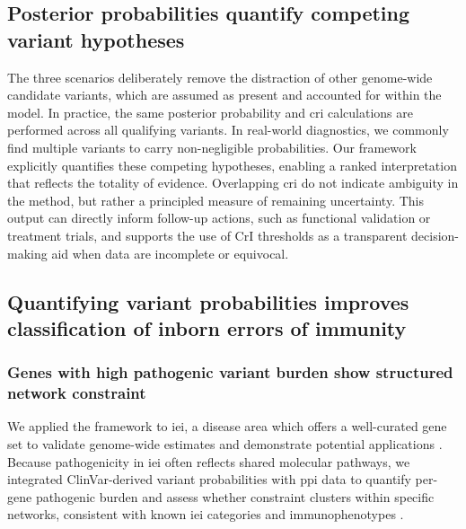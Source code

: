 \subsection{Posterior probabilities quantify competing variant hypotheses}

The three scenarios deliberately remove the distraction of other genome-wide candidate variants, which are assumed as present and accounted for within the model. In practice, the same posterior probability and \ac{cri} calculations are performed across all qualifying variants. 
In real-world diagnostics, we commonly find multiple variants to carry non-negligible probabilities. 
Our framework explicitly quantifies these competing hypotheses, enabling a ranked interpretation that reflects the totality of evidence. 
Overlapping \ac{cri} do not indicate ambiguity in the method, but rather a principled measure of remaining uncertainty. 
This output can directly inform follow-up actions, such as functional validation or treatment trials, and supports the use of CrI thresholds as a transparent decision-making aid when data are incomplete or equivocal.

\subsection{Quantifying variant probabilities improves classification of inborn errors of immunity}

\subsubsection*{Genes with high pathogenic variant burden show structured network constraint}

We applied the framework to \ac{iei}, a disease area 
which offers a well-curated gene set to validate genome-wide estimates and demonstrate potential applications \cite{poli_human_2025}. Because pathogenicity in \ac{iei} often reflects shared molecular pathways, we integrated ClinVar-derived variant probabilities with \ac{ppi} data to quantify per-gene pathogenic burden and assess whether constraint clusters within specific networks, consistent with known \ac{iei} categories and immunophenotypes \cite{szklarczyk2025string, karczewski2020mutational}.

